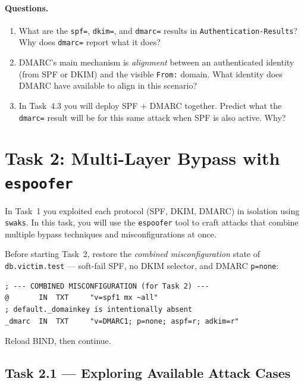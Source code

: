\documentclass[11pt]{article}
\begin{document}
\paragraph{Questions.}
\begin{enumerate}[noitemsep]
  \item What are the \texttt{spf=}, \texttt{dkim=}, and \texttt{dmarc=}
        results in \texttt{Authentication-Results}? Why does
        \texttt{dmarc=} report what it does?
  \item DMARC's main mechanism is \emph{alignment} between an
        authenticated identity (from SPF or DKIM) and the visible
        \texttt{From:} domain. What identity does DMARC have available
        to align in this scenario?
  \item In Task~4.3 you will deploy SPF + DMARC together. Predict what
        the \texttt{dmarc=} result will be for this same attack when
        SPF is also active. Why?
\end{enumerate}

\section{Task 2: Multi-Layer Bypass with \texttt{espoofer}}

In Task~1 you exploited each protocol (SPF, DKIM, DMARC) in isolation
using \texttt{swaks}.
In this task, you will use the \texttt{espoofer} tool to craft attacks
that combine multiple bypass techniques and misconfigurations at once.

Before starting Task~2, restore the \emph{combined misconfiguration}
state of \texttt{db.victim.test} --- soft-fail SPF, no DKIM selector,
and DMARC \texttt{p=none}:

\begin{listing}[H]
\begin{verbatim}
; --- COMBINED MISCONFIGURATION (for Task 2) ---
@       IN  TXT     "v=spf1 mx ~all"
; default._domainkey is intentionally absent
_dmarc  IN  TXT     "v=DMARC1; p=none; aspf=r; adkim=r"
\end{verbatim}
\end{listing}

Reload BIND, then continue.

\subsection{Task 2.1 --- Exploring Available Attack Cases}
\end{document}
